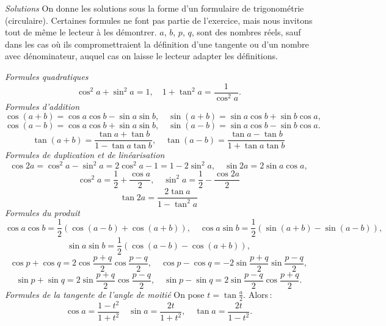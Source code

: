 	\emph{Solutions} On donne les solutions sous la forme d'un formulaire de trigonométrie (circulaire). Certaines formules ne font pas partie de l'exercice, mais nous invitons tout de même le lecteur à les démontrer. $a$, $b$, $p$, $q$, sont des nombres réels, sauf dans les cas où ils compromettraient la définition d'une tangente ou d'un nombre avec dénominateur, auquel cas on laisse le lecteur adapter les définitions.

	\emph{Formules quadratiques}
	\begin{equation}
		\cos^2a+\sin^2a=1,\quad 1+\tan^2a=\frac{1}{\cos^2a}.
	\end{equation}
	\emph{Formules d'addition}
	\begin{equation}
		\cos(a+b)=\cos a\cos b -\sin a\sin b,\quad \sin(a+b)=\sin a \cos b + \sin b \cos a,
	\end{equation}
	\begin{equation}
		\cos(a-b)=\cos a \cos b + \sin a \sin b,\quad \sin(a-b)=\sin a \cos b - \sin b \cos a.
	\end{equation}
	\begin{equation}
		\tan(a+b)=\frac{\tan a+\tan b}{1-\tan a\tan b},\quad \tan(a-b)=\frac{\tan a-\tan b}{1+\tan a\tan b}
	\end{equation}
	\emph{Formules de duplication et de linéarisation}
	\begin{equation}
		\cos 2a = \cos^2a-\sin^2a=2\cos^2a-1=1-2\sin^2a,\quad 	\sin 2a=2\sin a \cos a,
	\end{equation}
	\begin{equation}
		\cos^2a=\frac{1}{2}+\frac{\cos a}{2},\quad \sin^2a=\frac{1}{2}-\frac{\cos 2a}{2}
	\end{equation}
	\begin{equation}
		\tan 2a=\frac{2\tan a}{1-\tan^2a}
	\end{equation}
	\emph{Formules du produit}
	\begin{equation}
		\cos a\cos b=\frac{1}{2}(\cos(a-b)+\cos(a+b)),\quad \cos a \sin b=\frac{1}{2}(\sin(a+b)-\sin(a-b)),
	\end{equation}
	\begin{equation}
		\sin a\sin b=\frac{1}{2}(\cos(a-b)-\cos(a+b)),
	\end{equation}
	\begin{equation}
		\cos p+\cos q=2\cos\frac{p+q}{2}\cos\frac{p-q}{2},\quad \cos p-\cos q=-2\sin\frac{p+q}{2}\sin\frac{p-q}{2},
	\end{equation}
	\begin{equation}
		\sin p +\sin q=2\sin\frac{p+q}{2}\cos\frac{p-q}{2},\quad \sin p -\sin q=2\sin\frac{p-q}{2}\cos\frac{p+q}{2}.
	\end{equation}
	\emph{Formules de la tangente de l'angle de moitié}
	On pose $t=\tan\frac{a}{2}$. Alors\,:
	\begin{equation}
		\cos a=\frac{1-t^2}{1+t^2}\quad \sin a=\frac{2t}{1+t^2},\quad \tan a=\frac{2t}{1-t^2}.
	\end{equation}
